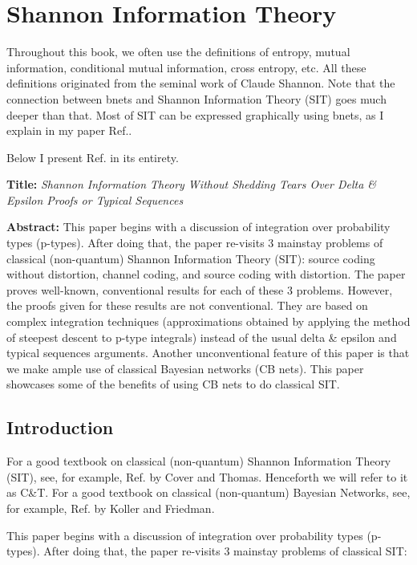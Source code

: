 \chapter{Shannon Information Theory}
\label{ch-shannon-info}

Throughout this book, we often use
the definitions of entropy, mutual information,
conditional mutual information, cross entropy, etc.
All these definitions originated from the seminal work
of Claude Shannon. Note that the
connection between bnets and Shannon Information Theory (SIT)
goes much deeper than that.
Most of SIT can be expressed graphically
using bnets, as I explain in
 my paper Ref.\cite{tucci-shannon-info}.

Below I present Ref.\cite{tucci-shannon-info} in its entirety.


{\bf Title:} {\it Shannon Information Theory
Without Shedding Tears
Over Delta \& Epsilon Proofs
or Typical Sequences}




{\bf Abstract:}
This paper begins with a
discussion of integration
over probability types (p-types).
After doing that, the paper re-visits
3 mainstay problems of classical (non-quantum)
Shannon Information Theory (SIT):
source coding without distortion,
channel coding,
and source coding with distortion.
The paper proves
well-known, conventional results for
each of these 3 problems. However,
the proofs given for these results
are not conventional. They
are based on complex integration techniques
(approximations obtained by applying
the method of steepest descent to
p-type integrals)
instead of the usual delta \& epsilon
and typical sequences
arguments.
Another
unconventional feature
of this paper
is that we make ample
use of classical Bayesian networks (CB nets).
This paper showcases
some of the benefits of using
CB nets to do classical SIT.




\newpage

\section{Introduction}

For a good textbook on classical (non-quantum)
Shannon
Information Theory (SIT), see, for example,
Ref.\cite{CovTh}
by Cover and Thomas.
Henceforth we will refer to
it
as C\&T.
For a good textbook on classical (non-quantum)
Bayesian Networks, see, for example,
Ref.\cite{KF}
by Koller and Friedman.

This paper begins with a
discussion of integration
over probability types (p-types).
After doing that, the paper re-visits
3 mainstay problems of classical
SIT:

